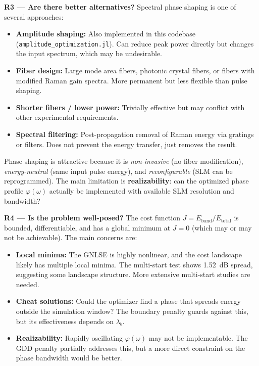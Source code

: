 \documentclass[12pt,a4paper]{article}
\theoremstyle{definition}
\begin{document}
\textbf{R3 --- Are there better alternatives?} Spectral phase shaping is one of several approaches:
\begin{itemize}[leftmargin=*]
\item \textbf{Amplitude shaping:} Also implemented in this codebase (\texttt{amplitude\_optimization.jl}). Can reduce peak power directly but changes the input spectrum, which may be undesirable.
\item \textbf{Fiber design:} Large mode area fibers, photonic crystal fibers, or fibers with modified Raman gain spectra. More permanent but less flexible than pulse shaping.
\item \textbf{Shorter fibers / lower power:} Trivially effective but may conflict with other experimental requirements.
\item \textbf{Spectral filtering:} Post-propagation removal of Raman energy via gratings or filters. Does not prevent the energy transfer, just removes the result.
\end{itemize}

Phase shaping is attractive because it is \emph{non-invasive} (no fiber modification), \emph{energy-neutral} (same input pulse energy), and \emph{reconfigurable} (SLM can be reprogrammed). The main limitation is \textbf{realizability}: can the optimized phase profile $\varphi(\omega)$ actually be implemented with available SLM resolution and bandwidth?

\textbf{R4 --- Is the problem well-posed?} The cost function $J = E_{\text{band}}/E_{\text{total}}$ is bounded, differentiable, and has a global minimum at $J=0$ (which may or may not be achievable). The main concerns are:
\begin{itemize}[leftmargin=*]
\item \textbf{Local minima:} The GNLSE is highly nonlinear, and the cost landscape likely has multiple local minima. The multi-start test shows 1.52~dB spread, suggesting some landscape structure. More extensive multi-start studies are needed.
\item \textbf{Cheat solutions:} Could the optimizer find a phase that spreads energy outside the simulation window? The boundary penalty guards against this, but its effectiveness depends on $\lambda_b$.
\item \textbf{Realizability:} Rapidly oscillating $\varphi(\omega)$ may not be implementable. The GDD penalty partially addresses this, but a more direct constraint on the phase bandwidth would be better.
\end{itemize}
\end{document}
